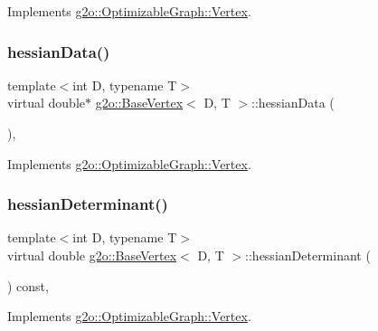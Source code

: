 Implements \mbox{\hyperlink{classg2o_1_1_optimizable_graph_1_1_vertex_ade95d46370bb9a86f64c4e591726ad62}{g2o\+::\+Optimizable\+Graph\+::\+Vertex}}.

\mbox{\label{classg2o_1_1_base_vertex_aedf92fbb5c2c86185422a955be02a3a6}} 
\subsubsection{\texorpdfstring{hessian\+Data()}{hessianData()}}
{\footnotesize\ttfamily template$<$int D, typename T$>$ \\
virtual double$\ast$ \mbox{\hyperlink{classg2o_1_1_base_vertex}{g2o\+::\+Base\+Vertex}}$<$ D, T $>$\+::hessian\+Data (\begin{DoxyParamCaption}{ }\end{DoxyParamCaption})\hspace{0.3cm}{\ttfamily [inline]}, {\ttfamily [virtual]}}



Implements \mbox{\hyperlink{classg2o_1_1_optimizable_graph_1_1_vertex_a4ec536d8c82d839e507d89c7a7e368ae}{g2o\+::\+Optimizable\+Graph\+::\+Vertex}}.

\mbox{\label{classg2o_1_1_base_vertex_a1217e0fe47e7259f039d468397cddb15}} 
\subsubsection{\texorpdfstring{hessian\+Determinant()}{hessianDeterminant()}}
{\footnotesize\ttfamily template$<$int D, typename T$>$ \\
virtual double \mbox{\hyperlink{classg2o_1_1_base_vertex}{g2o\+::\+Base\+Vertex}}$<$ D, T $>$\+::hessian\+Determinant (\begin{DoxyParamCaption}{ }\end{DoxyParamCaption}) const\hspace{0.3cm}{\ttfamily [inline]}, {\ttfamily [virtual]}}



Implements \mbox{\hyperlink{classg2o_1_1_optimizable_graph_1_1_vertex_adaed502500d9ddc9f1721aba635da4d6}{g2o\+::\+Optimizable\+Graph\+::\+Vertex}}.


